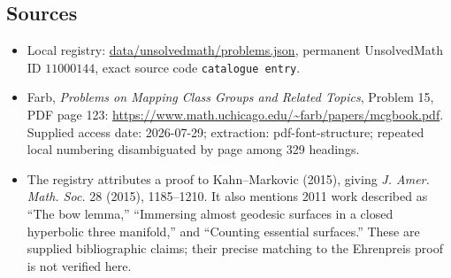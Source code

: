 \documentclass[11pt]{article}
\begin{document}
\subsection{Sources}
\begin{itemize}
\item Local registry: \url{data/unsolvedmath/problems.json}, permanent UnsolvedMath ID $11000144$, exact source code \texttt{catalogue entry}.
\item Farb, \emph{Problems on Mapping Class Groups and Related Topics}, Problem 15, PDF page 123: \url{https://www.math.uchicago.edu/~farb/papers/mcgbook.pdf}. Supplied access date: 2026-07-29; extraction: pdf-font-structure; repeated local numbering disambiguated by page among 329 headings.
\item The registry attributes a proof to Kahn--Markovic (2015), giving \emph{J. Amer. Math. Soc.} 28 (2015), 1185--1210. It also mentions 2011 work described as ``The bow lemma,'' ``Immersing almost geodesic surfaces in a closed hyperbolic three manifold,'' and ``Counting essential surfaces.'' These are supplied bibliographic claims; their precise matching to the Ehrenpreis proof is not verified here.
\end{itemize}
\end{document}
